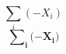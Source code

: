 \documentclass{article}
\newcommand{\bX}{\boldsymbol{X}}
\newcommand{\bi}{\boldsymbol{i}}
\newcommand{\bMinus}{\boldsymbol{-}}
\newcommand{\bSum}{\boldsymbol{\sum}}
\newcommand{\bLeft}{\boldsymbol{(}}
\newcommand{\bRight}{\boldsymbol{)}}
\begin{document}
\[ \sum_{i} ( - X_{i} ) \]
\[ \bSum_{\bi} \bLeft \bMinus \bX_{\bi} \bRight \]
\end{document}
